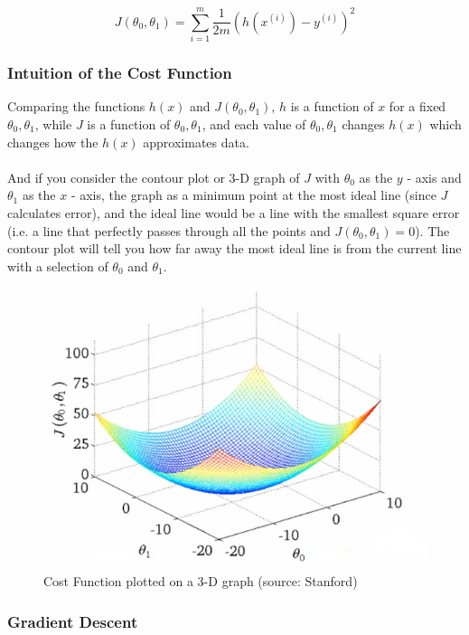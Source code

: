 \documentclass[12pt]{article}
\begin{document}
$$J(\theta_0, \theta_1) = \sum^m_{i=1} \frac{1}{2m} (h(x^{(i)}) - y^{(i)})^2$$

\subsubsection{Intuition of the Cost Function}

Comparing the functions $h(x)$ and $J(\theta_0, \theta_1)$, $h$ is a function of $x$ for a fixed $\theta_0, \theta_1$, while $J$ is a function of $\theta_0, \theta_1$, and each value of $\theta_0, \theta_1$ changes $h(x)$ which changes how the $h(x)$ approximates data.\\
\\
And if you consider the contour plot or 3-D graph of $J$ with $\theta_0$ as the $y$ - axis and $\theta_1$ as the $x$ - axis, the graph as a minimum point at the most ideal line (since $J$ calculates error), and the ideal line would be a line with the smallest square error (i.e. a line that perfectly passes through all the points and $J(\theta_0, \theta_1) = 0$). The contour plot will tell you how far away the most ideal line is from the current line with a selection of $\theta_0$ and $\theta_1$.

\begin{figure}
  \includegraphics[width=\linewidth]{cost.png}
  \caption{Cost Function plotted on a 3-D graph (source: Stanford)}
\end{figure}

\subsubsection{Gradient Descent}
\end{document}

